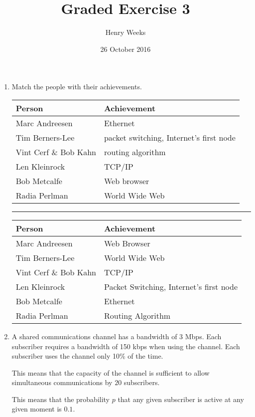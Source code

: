 \documentclass[twoside]{article}
\title{Graded Exercise 3}
\author{Henry Weeks}
\date{26 October 2016}
\newenvironment{answer}
  {\vspace*{0.2cm} \rule{12cm}{0.04cm} \vspace*{0.2cm}}
  {\vspace*{0.2cm}}
\begin{document}
\maketitle

\begin{enumerate}
  \item Match the people with their achievements.

  \begin{tabular}{l|l}
    \textbf{Person} & \textbf{Achievement} \\ \hline
    Marc Andreesen & Ethernet \\
    Tim Berners-Lee & packet switching, Internet's first node \\
    Vint Cerf \& Bob Kahn & routing algorithm \\    
    Len Kleinrock & TCP/IP \\
    Bob Metcalfe & Web browser \\
    Radia Perlman & World Wide Web
    \end{tabular}

  \begin{answer}

  \begin{tabular}{l|l}
    \textbf{Person} & \textbf{Achievement} \\ \hline
    Marc Andreesen & Web Browser \\
    Tim Berners-Lee &  World Wide Web \\
    Vint Cerf \& Bob Kahn & TCP/IP \\    
    Len Kleinrock & Packet Switching, Internet's first node \\
    Bob Metcalfe & Ethernet \\
    Radia Perlman & Routing Algorithm
    \end{tabular}

    \end{answer}

  \item A shared communications channel has a bandwidth of 3 Mbps.
    Each subscriber requires a bandwidth of 150 kbps when
    using the channel.
    Each subscriber uses the channel only 10\% of the time.

    This means that the capacity of the channel is sufficient to
    allow simultaneous communications by $20$ subscribers.

    This means that the probability $p$ that any given subscriber is active at any given moment
    is $0.1$.


\end{enumerate}
\end{document}
